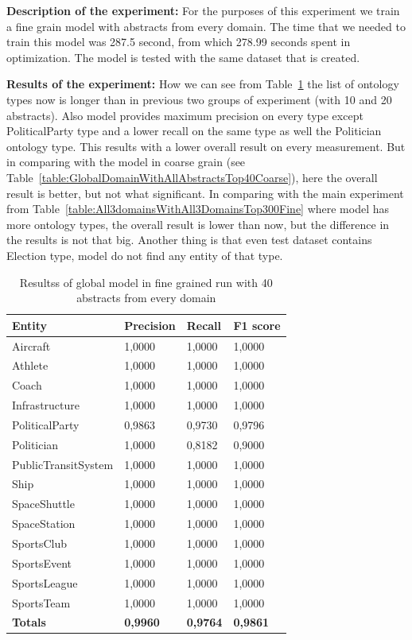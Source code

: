 \documentclass[thesis=M,english]{FITthesis}[2018/05/30]
\begin{document}
	
	\textbf{Description of the experiment:} For the purposes of this experiment we train a fine grain model with abstracts from every domain. The time that we needed to train this model was 287.5 second, from which 278.99 seconds spent in optimization. The model is tested with the same dataset that is created.

	\textbf{Results of the experiment:} How we can see from Table~\ref{table:GlobalDomainWithAllAbstractsTop40Fine} the list of ontology types now is longer than in previous two groups of experiment (with 10 and 20 abstracts). Also model provides maximum precision on every type except PoliticalParty type and a lower recall on the same type as well the Politician ontology type. This results with a lower overall result on every measurement. But in comparing with the model in coarse grain (see Table~\ref{table:GlobalDomainWithAllAbstractsTop40Coarse}), here the overall result is better, but not what significant. In comparing with the main experiment from Table~\ref{table:All3domainsWithAll3DomainsTop300Fine} where model has more ontology types, the overall result is lower than now, but the difference in the results is not that big. Another thing is that even test dataset contains Election type, model do not find any entity of that type.  
	
	\begin{table}[H]\centering
		\begin{tabular}{|l|l|l|l|}
			\hline {\textbf{Entity}} & {\textbf{Precision}} & {\textbf{Recall}} & {\textbf{F1 score}}\\\hline
				Aircraft & 1,0000 & 1,0000 & 1,0000\\
				Athlete & 1,0000 & 1,0000 & 1,0000\\
				Coach & 1,0000 & 1,0000 & 1,0000\\
				Infrastructure & 1,0000 & 1,0000 & 1,0000\\
				PoliticalParty & 0,9863 & 0,9730 & 0,9796\\
				Politician & 1,0000 & 0,8182 & 0,9000\\
				PublicTransitSystem & 1,0000 & 1,0000 & 1,0000\\
				Ship & 1,0000 & 1,0000 & 1,0000\\
				SpaceShuttle & 1,0000 & 1,0000 & 1,0000\\
				SpaceStation & 1,0000 & 1,0000 & 1,0000\\ 
				SportsClub & 1,0000 & 1,0000 & 1,0000\\
				SportsEvent & 1,0000 & 1,0000 & 1,0000\\
				SportsLeague & 1,0000 & 1,0000 & 1,0000\\
				SportsTeam & 1,0000 & 1,0000 & 1,0000\\\hline
				\textbf{Totals} & \textbf{0,9960} & \textbf{0,9764} & \textbf{0,9861}\\\hline
		\end{tabular}
		\caption{Resultss of global model in fine grained run with 40 abstracts from every domain \label{table:GlobalDomainWithAllAbstractsTop40Fine}}
	\end{table}
\end{document}
